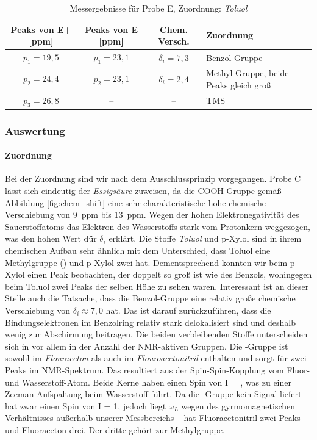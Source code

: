 \documentclass[a4paper]{scrartcl} %
\begin{document}
\begin{table}[!htb]
	\centering
	\caption{Messergebnisse für Probe E, Zuordnung: \emph{Toluol} }
	\label{tab:Probe_E}
	\begin{tabularx}{1.0\linewidth}{cccX}
	\toprule
	Peaks von E+ [ppm] & Peaks von E [ppm] & Chem. Versch. & Zuordnung \\
	\midrule
	$p_1 = 19,5$ & $p_1 = 23,1$ & $\delta_i = 7,3 $ & Benzol-Gruppe \\

	$p_2 = 24,4$ & $p_2 = 23,1$ & $\delta_i = 2,4$ & Methyl-Gruppe, beide Peaks gleich groß \\

	$p_3 = 26,8$ & -- & -- & TMS \\

	\bottomrule
	\end{tabularx}

\end{table}

\subsubsection{Auswertung}
\paragraph{Zuordnung}

Bei der Zuordnung sind wir nach dem Ausschlussprinzip vorgegangen. Probe C lässt sich eindeutig der \emph{Essigsäure} zuweisen, da die COOH-Gruppe gemäß Abbildung \ref{fig:chem_shift} eine sehr charakteristische hohe chemische Verschiebung von \SI{9}{ppm} bis \SI{13}{ppm}. Wegen der hohen Elektronegativität des Sauerstoffatoms das Elektron des Wasserstoffs stark vom Protonkern weggezogen, was den hohen Wert dür $\delta_i$ erklärt.
Die Stoffe \emph{Toluol} und {p-Xylol} sind in ihrem chemischen Aufbau sehr ähnlich mit dem Unterschied, dass Toluol eine Methylgruppe () und p-Xylol zwei hat. Dementsprechend konnten wir beim p-Xylol einen Peak beobachten, der doppelt so groß ist wie des Benzols, wohingegen beim Toluol zwei Peaks der selben Höhe zu sehen waren. Interessant ist an dieser Stelle auch die Tatsache, dass die Benzol-Gruppe eine relativ große chemische Verschiebung von $\delta_i \approx 7,0$ hat. Das ist darauf zurückzuführen, dass die Bindungselektronen im Benzolring relativ stark delokalisiert sind und deshalb wenig zur Abschirmung beitragen.
Die beiden verbleibenden Stoffe unterscheiden sich in vor allem in der Anzahl der NMR-aktiven Gruppen. Die -Gruppe ist sowohl im \emph{Flouraceton} als auch im \emph{Flouroacetonitril} enthalten und sorgt für zwei Peaks im NMR-Spektrum. Das resultiert aus der Spin-Spin-Kopplung vom Fluor- und Wasserstoff-Atom. Beide Kerne haben einen Spin von I = , was zu einer Zeeman-Aufspaltung beim Wasserstoff führt. Da die -Gruppe kein Signal liefert --  hat zwar einen Spin von I = 1, jedoch liegt $\omega_L$ wegen des gyrmomagnetischen Verhältnisses außerhalb unserer Messbereichs -- hat Fluoracetonitril zwei Peaks und Fluoraceton drei. Der dritte gehört zur Methylgruppe.
\end{document}
